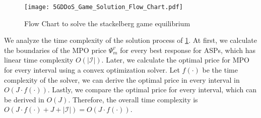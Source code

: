 \documentclass[10pt,journal, compsoc]{IEEEtran}
\begin{document}
\begin{figure}
    \centering
    \texttt{[image: 5GDDoS\_Game\_Solution\_Flow\_Chart.pdf]}
    \caption{Flow Chart to solve the stackelberg game equilibrium}
    \label{fig:flow_chart_sol}
\end{figure}

We analyze the time complexity of the solution process of \cref{fig:flow_chart_sol}. At first, we calculate the boundaries of the MPO price $\Psi^v_m$ for every best response for ASPs, which has linear time complexity $O(|\mathcal{I}|)$. Later, we calculate the optimal price for MPO for every interval using a convex optimization solver. Let $f(\cdot)$ be the time complexity of the solver, we can derive the optimal price in every interval in $O(J\cdot f(\cdot))$. Lastly, we compare the optimal price for every interval, which can be derived in $O(J)$. Therefore, the overall time complexity is $O(J\cdot f(\cdot) + J + |\mathcal{I}|) = O(J\cdot f(\cdot))$.
\end{document}
